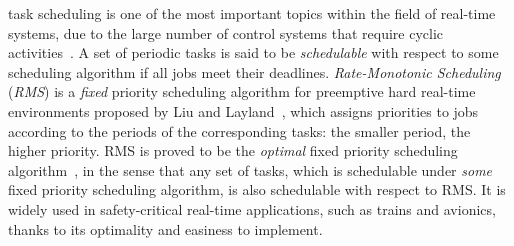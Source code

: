 \documentclass[10pt,journal,compsoc]{IEEEtran}
\begin{document}




% 
% 
% 
% 
 task scheduling is one of the most important
topics within the field of real-time systems, due to the large number
of control systems that require cyclic
activities~\cite{buttazzo2011hard}. A set of periodic tasks is said to
be \emph{schedulable} with respect to some scheduling algorithm if all
jobs meet their deadlines. \emph{Rate-Monotonic Scheduling}
(\emph{RMS}) is a \emph{fixed} priority scheduling algorithm for
preemptive hard real-time environments proposed by Liu and
Layland~\cite{DBLP:journals/jacm/LiuL73}, which assigns priorities to
jobs according to the periods of the corresponding tasks: the smaller
period, the higher priority. RMS is proved to be the \emph{optimal}
fixed priority scheduling algorithm~\cite{DBLP:journals/jacm/LiuL73},
in the sense that any set of tasks, which is schedulable under
\emph{some} fixed priority scheduling algorithm, is also schedulable
with respect to RMS. It is widely used in safety-critical real-time
applications, such as trains and avionics, thanks to its optimality
and easiness to implement.
\end{document}
